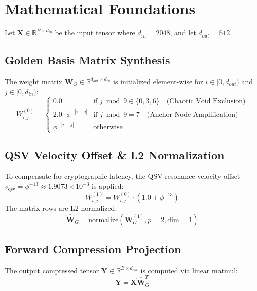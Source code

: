 \section{Mathematical Foundations}
Let $\mathbf{X} \in \mathbb{R}^{B \times d_{in}}$ be the input tensor where $d_{in} = 2048$, and let $d_{out} = 512$.

\subsection{Golden Basis Matrix Synthesis}
The weight matrix $\mathbf{W}_G \in \mathbb{R}^{d_{out} \times d_{in}}$ is initialized element-wise for $i \in [0, d_{out})$ and $j \in [0, d_{in})$:
\begin{equation}
    W_{i,j}^{(0)} = \begin{cases}
        0.0 & \text{if } j \bmod 9 \in \{0,3,6\} \quad \text{(Chaotic Void Exclusion)} \\
        2.0 \cdot \phi^{-|i-j|} & \text{if } j \bmod 9 = 7 \quad \text{(Anchor Node Amplification)} \\
        \phi^{-|i-j|} & \text{otherwise}
    \end{cases}
\end{equation}

\subsection{QSV Velocity Offset \& L2 Normalization}
To compensate for cryptographic latency, the QSV-resonance velocity offset $v_{\text{qsv}} = \phi^{-13} \approx 1.9073 \times 10^{-3}$ is applied:
\begin{equation}
    W_{i,j}^{(1)} = W_{i,j}^{(0)} \cdot \left(1.0 + \phi^{-13}\right)
\end{equation}
The matrix rows are L2-normalized:
\begin{equation}
    \hat{\mathbf{W}}_G = \text{normalize}\left(\mathbf{W}_G^{(1)}, p=2, \text{dim}=1\right)
\end{equation}

\subsection{Forward Compression Projection}
The output compressed tensor $\mathbf{Y} \in \mathbb{R}^{B \times d_{out}}$ is computed via linear matmul:
\begin{equation}
    \mathbf{Y} = \mathbf{X} \hat{\mathbf{W}}_G^T
\end{equation}